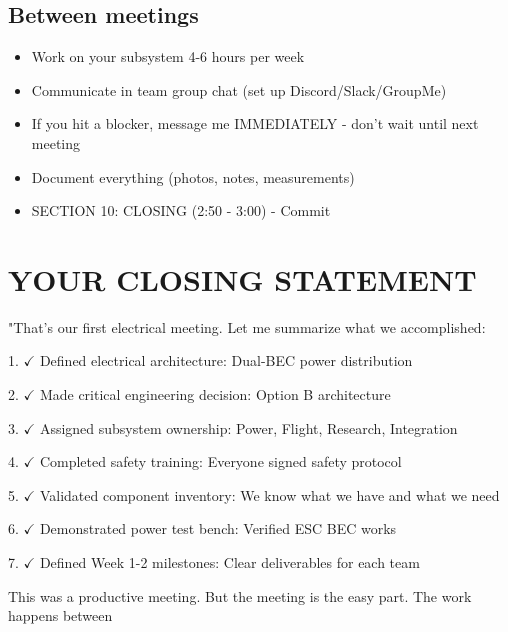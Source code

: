 \documentclass[11pt,letterpaper]{article}
\begin{document}
{\subsection{Between meetings}

\begin{itemize}
  \item Work on your subsystem 4-6 hours per week
  \item Communicate in team group chat (set up Discord/Slack/GroupMe)
  \item If you hit a blocker, message me IMMEDIATELY - don't wait until next meeting
  \item Document everything (photos, notes, measurements)
\end{itemize}

\begin{itemize}
  \item SECTION 10: CLOSING (2:50 - 3:00) - Commit
\end{itemize}

\section{YOUR CLOSING STATEMENT}

"That's our first electrical meeting. Let me summarize what we accomplished:\par

1. $\checkmark$ Defined electrical architecture: Dual-BEC power distribution\par

2. $\checkmark$ Made critical engineering decision: Option B architecture\par

3. $\checkmark$ Assigned subsystem ownership: Power, Flight, Research, Integration\par

4. $\checkmark$ Completed safety training: Everyone signed safety protocol\par

5. $\checkmark$ Validated component inventory: We know what we have and what we need\par

6. $\checkmark$ Demonstrated power test bench: Verified ESC BEC works\par

7. $\checkmark$ Defined Week 1-2 milestones: Clear deliverables for each team\par

This was a productive meeting. But the meeting is the easy part. The work happens between\par

}
\end{document}
